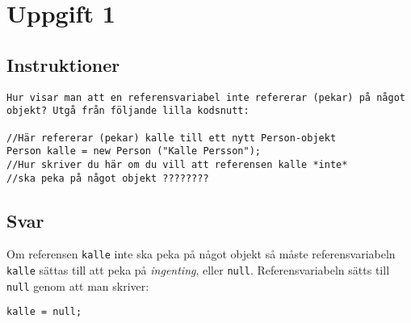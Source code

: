 \section{Uppgift 1}\label{sec:uppg01}

\subsection{Instruktioner}
\begin{verbatim}
Hur visar man att en referensvariabel inte refererar (pekar) på något
objekt? Utgå från följande lilla kodsnutt:

//Här refererar (pekar) kalle till ett nytt Person-objekt
Person kalle = new Person ("Kalle Persson");
//Hur skriver du här om du vill att referensen kalle *inte*
//ska peka på något objekt ????????
\end{verbatim}


\subsection{Svar}
Om referensen \texttt{kalle} inte ska peka på något objekt så måste
referensvariabeln \texttt{kalle} sättas till att peka på \emph{ingenting},
eller \texttt{null}.  Referensvariabeln sätts till \texttt{null} genom att man
skriver:
\begin{verbatim}kalle = null;\end{verbatim}

